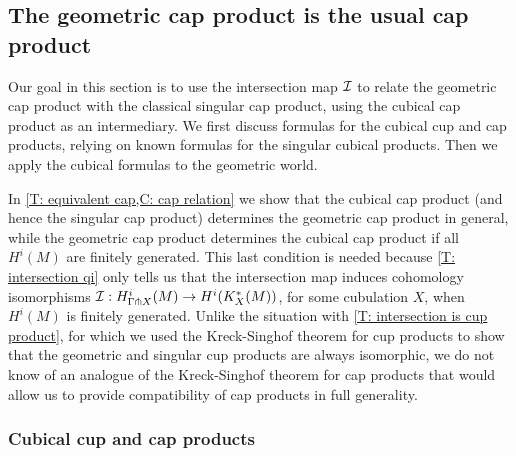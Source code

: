 \begin{comment}
\begin{theorem}
Let $M$ and $N$ be manifolds. Then the geometric cohomology cross product $H^i_\Gamma(M) \otimes H^j_\Gamma(N) \to H^{i+j}_\Gamma(M \times N)$ is isomorphic to the singular cohomology cross product $H^i(M) \otimes H^j(N) \to H^{i+j}(M \times N)$.
\end{theorem}



\begin{proof}
NEED MORE GENERAL INTERSECTION MAP THEOREM OR TO RESTRICT TO COMPACT MANIFOLDS

\end{proof}
\end{comment}




\subsection{The geometric cap product is the usual cap product}

Our goal in this section is to use the intersection map $\mathcal{I}$ to relate the geometric cap product with the classical singular cap product, using the cubical cap product as an intermediary. We first discuss formulas for the cubical cup and cap products, relying on known formulas for the singular cubical products. Then we apply the cubical formulas to the geometric world.

In \cref{T: equivalent cap,C: cap relation} we show that the cubical cap product (and hence the singular cap product) determines the geometric cap product in general, while the geometric cap product determines the cubical cap product if all $H^i(M)$ are finitely generated. This last condition is needed because \cref{T: intersection qi} only tells us that the intersection map induces cohomology isomorphisms $\mathcal{I}: H^i_{\Gamma\pitchfork X}(M) \to H^i(K_X^*(M))$, for some cubulation $X$, when $H^i(M)$ is finitely generated. Unlike the situation with \cref{T: intersection is cup product}, for which we used the Kreck-Singhof theorem for cup products to show that the geometric and singular cup products are always isomorphic, we do not know of an analogue of the Kreck-Singhof theorem for cap products that would allow us to provide compatibility of cap products in full generality.




\subsubsection{Cubical cup and cap products}\label{S: cubical products}

